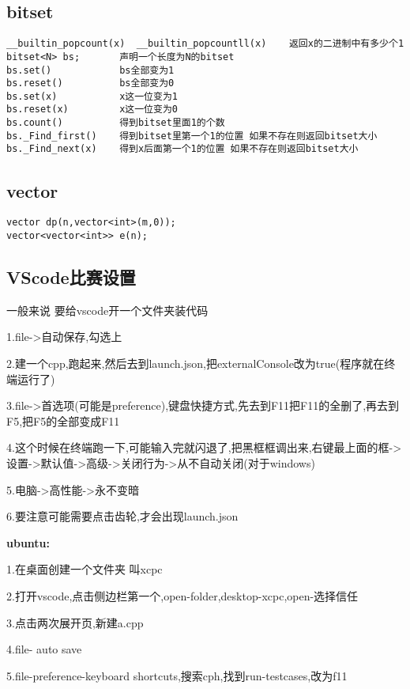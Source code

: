\documentclass[a4paper]{ctexart}
\begin{document}
\subsection{bitset}

\begin{lstlisting}
__builtin_popcount(x)  __builtin_popcountll(x)    返回x的二进制中有多少个1
bitset<N> bs;       声明一个长度为N的bitset
bs.set()            bs全部变为1
bs.reset()	        bs全部变为0
bs.set(x)	        x这一位变为1
bs.reset(x)	        x这一位变为0
bs.count()          得到bitset里面1的个数
bs._Find_first()    得到bitset里第一个1的位置 如果不存在则返回bitset大小
bs._Find_next(x)    得到x后面第一个1的位置 如果不存在则返回bitset大小
\end{lstlisting}

\subsection{vector}

\begin{lstlisting}
vector dp(n,vector<int>(m,0));
vector<vector<int>> e(n);
\end{lstlisting}

\subsection{VScode比赛设置}

一般来说 要给vscode开一个文件夹装代码 

1.file->自动保存,勾选上 

2.建一个cpp,跑起来,然后去到launch.json,把externalConsole改为true(程序就在终端运行了)

3.file->首选项(可能是preference),键盘快捷方式,先去到F11把F11的全删了,再去到F5,把F5的全部变成F11 

4.这个时候在终端跑一下,可能输入完就闪退了,把黑框框调出来,右键最上面的框->设置->默认值->高级->关闭行为->从不自动关闭(对于windows)

5.电脑->高性能->永不变暗

6.要注意可能需要点击齿轮,才会出现launch.json

\textbf{ubuntu:}

1.在桌面创建一个文件夹 叫xcpc

2.打开vscode,点击侧边栏第一个,open-folder,desktop-xcpc,open-选择信任

3.点击两次展开页,新建a.cpp

4.file- auto save

5.file-preference-keyboard shortcuts,搜索cph,找到run-testcases,改为f11
\end{document}
